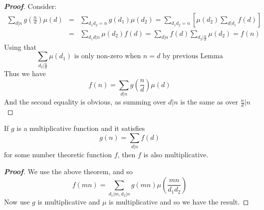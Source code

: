 \begin{proof}[\bf Proof] Consider:
\begin{eqnarray*}
\sum_{d|n}g \left(\frac{n}{d}\right) \mu(d) & = & \sum_{d_1 d_2 =n} g(d_1) \mu(d_2) =\sum_{d_1 d_2 =n} [\mu(d_2) \sum_{d|d_1}f(d)]\\
& = & \sum_{d_1 d |n}\mu(d_2) f(d) = \sum_{d|n}f(d) \sum_{d_2 |\frac{n}{d}} \mu(d_2)  =  f(n)
\end{eqnarray*}
Using that \begin{equation*} \sum_{d_2|\frac{n}{d}}\mu(d_1) \text{ is only non-zero when $n =d$ by previous Lemma} \end{equation*}
Thus we have \begin{equation*} f(n)=\sum_{d|n} g \left(\frac{n}{d}\right)\mu(d) \end{equation*}
And the second equality is obvious, as summing over $d|n$ is the same as over $\frac{n}{d} | n$
\end{proof}
\begin{theorem} If $g$ is a multiplicative function and it satisfies
\begin{equation*} g(n)=\sum_{d|n}f(d) \end{equation*} for some number theoretic function $f$, then $f$ is also multiplicative.
\end{theorem}
\begin{proof}[\bf Proof] We use the above theorem, and so
\begin{equation*} f(mn)=\sum_{d_1|m, d_2 |n}g(mn)\mu \left(\frac{mn}{d_1d_2}\right) \end{equation*}
Now use $g$ is multiplicative and $\mu$ is multiplicative and so we have the result.
\end{proof}
